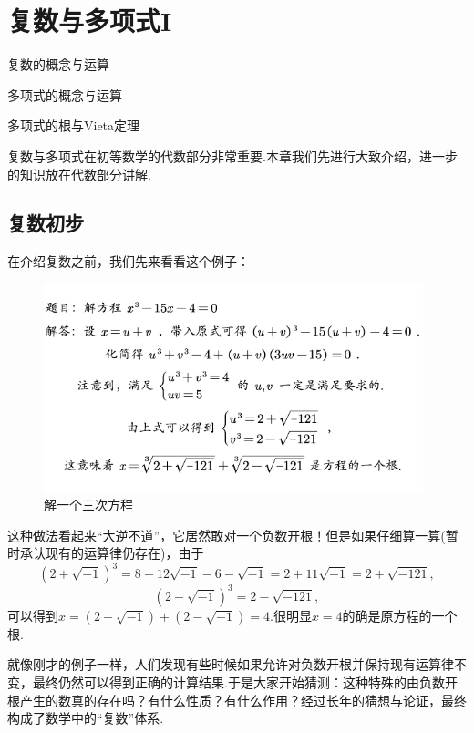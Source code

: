 \documentclass[lang=cn, zihao=5]{elegantbook}
\begin{document}
\chapter{复数与多项式I}

\begin{introduction}
	\item 复数的概念与运算
	\item 多项式的概念与运算
	\item 多项式的根与Vieta定理
\end{introduction}

复数与多项式在初等数学的代数部分非常重要.本章我们先进行大致介绍，进一步的知识放在代数部分讲解.

\section{复数初步}

在介绍复数之前，我们先来看看这个例子：

\begin{figure}[H]
	\centering
	\includegraphics[width=11cm]{attachment/202304152fuuu.pdf}
	\caption{解一个三次方程}
\end{figure}

这种做法看起来“大逆不道”，它居然敢对一个负数开根！但是如果仔细算一算(暂时承认现有的运算律仍存在)，由于
$$(2+\sqrt{-1})^3 = 8 + 12\sqrt{-1} - 6 - \sqrt{-1} = 2+11\sqrt{-1}=2+\sqrt{-121},$$
$$(2-\sqrt{-1})^3 = 2-\sqrt{-121},$$
可以得到$x=(2+\sqrt{-1})+(2-\sqrt{-1})=4$.很明显$x=4$的确是原方程的一个根.

就像刚才的例子一样，人们发现有些时候如果允许对负数开根并保持现有运算律不变，最终仍然可以得到正确的计算结果.于是大家开始猜测：这种特殊的由负数开根产生的数真的存在吗？有什么性质？有什么作用？经过长年的猜想与论证，最终构成了数学中的“复数”体系.
\end{document}
